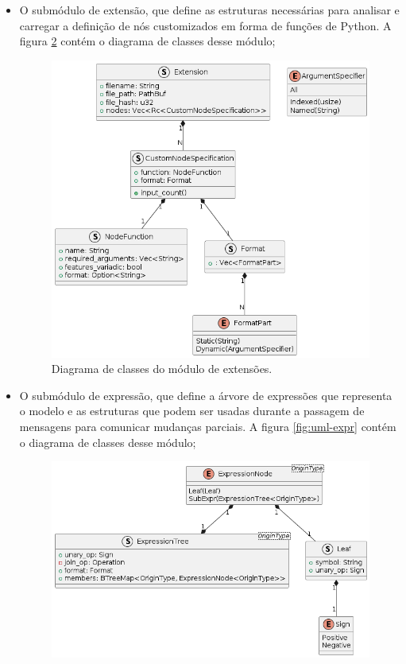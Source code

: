 \documentclass[
	12pt,				%
	openright,			%
	oneside,			%
	a4paper,			%
	main=brazil,
	english,			%
	]{ufsj-abntex2}
\begin{document}
\begin{itemize}
\begin{figure}[h]
        \label{fig:uml-nodes}
    \end{figure}
    \item O submódulo de extensão, que define as estruturas necessárias para analisar e carregar a definição de nós customizados em forma de funções de Python. A figura \ref{fig:uml-extensions} contém o diagrama de classes desse módulo;
    \begin{figure}[h]
        \centering
        \includegraphics[scale=0.45]{diagrams/img/extensions.png} 
        \caption{Diagrama de classes do módulo de extensões.}
        \label{fig:uml-extensions}
    \end{figure}
    \item O submódulo de expressão, que define a árvore de expressões que representa o modelo e as estruturas que podem ser usadas durante a passagem de mensagens para comunicar mudanças parciais. A figura \ref{fig:uml-expr} contém o diagrama de classes desse módulo;
    \begin{figure}[h]
        \centering
        \includegraphics[scale=0.6]{diagrams/img/exprtree.png} 

\end{figure}
\end{itemize}
\end{document}
